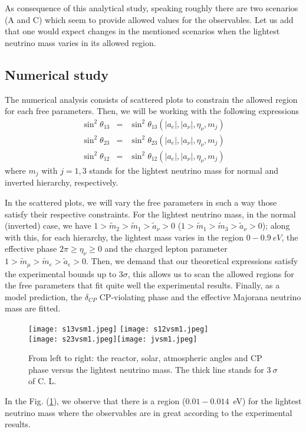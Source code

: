 \documentclass[aps,prd,groupaddress,floatfix,tighten,nofootinbib,showpacs,amsfonts,superscriptaddress]{revtex4-2}
\newcommand{\nn}{\nonumber}
\begin{document}
As consequence of this analytical study, speaking roughly there are two scenarios (A and C) which seem to provide allowed values for the observables. Let us add that one would expect changes in the mentioned scenarios when
the lightest neutrino mass varies in its allowed region. 






\subsection{Numerical study}

The numerical analysis  consists of scattered plots to constrain the allowed region for each free parameters. Then, we will be working with the following expressions 
\begin{eqnarray}\label{mixan2}
\sin^{2}{\theta}_{13}&=&\sin^{2}{\theta}_{13}\left(\vert a_{e}\vert, \vert a_{\nu}\vert, \eta_{\nu}, m_{j} \right)\nn\\
\sin^{2}{\theta}_{23}&=&\sin^{2}{\theta}_{23}\left(\vert a_{e}\vert, \vert a_{\nu}\vert, \eta_{\nu}, m_{j} \right) \nn\\
\sin^{2}{\theta}_{12}&=&\sin^{2}{\theta}_{12}\left(\vert a_{e}\vert, \vert a_{\nu}\vert, \eta_{\nu}, m_{j} \right)
\end{eqnarray}
where $m_{j}$ with $j=1, 3$ stands for the lightest neutrino mass for normal and inverted hierarchy, respectively. 

In the scattered plots, we will vary the free parameters in such a way those satisfy their respective constraints. For the lightest neutrino mass, in the normal (inverted) case, we have $1>\tilde{m}_{2}>\tilde{m}_{1}>\tilde{a}_{\nu}>0$  ($1>\tilde{m}_{1}>\tilde{m}_{3}>\tilde{a}_{\nu}>0$); along with this, for each hierarchy, the lightest mass varies in the region $0-0.9~eV$, the effective phase $2\pi\geq \eta_{\nu}\geq0$ and the charged lepton parameter $1>\tilde{m}_{\mu}>\tilde{m}_{e}>\tilde{a}_{e}>0$. Then, we demand that our theoretical expressions satisfy the experimental bounds up to $3\sigma$, this allows us to scan the allowed regions for the free parameters that fit quite well the experimental results. Finally, as a model prediction, the $\delta_{CP}$ CP-violating phase and the effective Majorana neutrino mass are fitted.

\begin{figure}[h]
	\centering
	\texttt{[image: s13vsm1.jpeg]}
	\hspace{1mm}\texttt{[image: s12vsm1.jpeg]}\\
	\texttt{[image: s23vsm1.jpeg]}\hspace{1mm}\texttt{[image: jvsm1.jpeg]}
	\caption{From left to right: the reactor, solar, atmospheric angles and CP phase versus the lightest neutrino mass. The thick line stands for $3~\sigma$ of C. L.}\label{f1}
\end{figure}
In the Fig. (\ref{f1}), we observe that there is a region ($0.01-0.014$~eV) for the lightest neutrino mass where the observables are in great according to the experimental results. 
\end{document}
